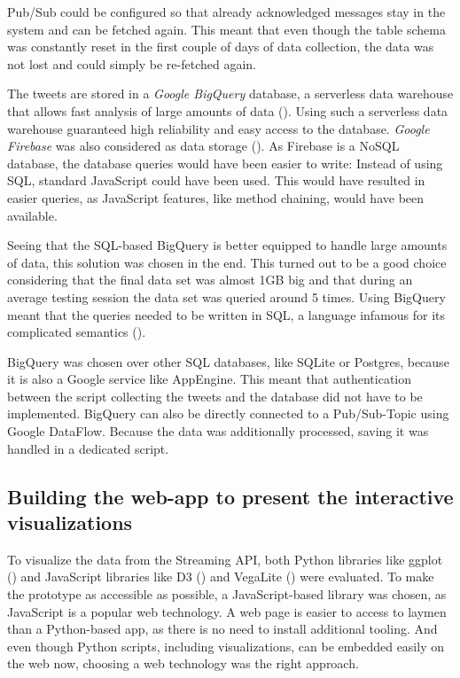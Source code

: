 Pub/Sub could be configured so that already acknowledged messages stay in the system and can be fetched again. This meant that even though the table schema was constantly reset in the first couple of days of data collection, the data was not lost and could simply be re-fetched again.

The tweets are stored in a \emph{Google BigQuery} database, a serverless data warehouse that allows fast analysis of large amounts of data (\cite{googleBigQueryCloudData2020}). Using such a serverless data warehouse guaranteed high reliability and easy access to the database. \emph{Google Firebase} was also considered as data storage (\cite{googleCloudFirestoreFirebase2020}). As Firebase is a NoSQL database, the database queries would have been easier to write: Instead of using SQL, standard JavaScript could have been used. This would have resulted in easier queries, as JavaScript features, like method chaining, would have been available.

Seeing that the SQL-based BigQuery is better equipped to handle large amounts of data, this solution was chosen in the end. This turned out to be a good choice considering that the final data set was almost 1GB big and that during an average testing session the data set was queried around 5 times. Using BigQuery meant that the queries needed to be written in SQL, a language infamous for its complicated semantics (\cite{slutz1998massive}).

BigQuery was chosen over other SQL databases, like SQLite or Postgres, because it is also a Google service like AppEngine. This meant that authentication between the script collecting the tweets and the database did not have to be implemented. BigQuery can also be directly connected to a Pub/Sub-Topic using Google DataFlow. Because the data was additionally processed, saving it was handled in a dedicated script. 

\subsection{Building the web-app to present the interactive visualizations}
To visualize the data from the Streaming API, both Python libraries like ggplot (\cite{wickhamGgplot2ElegantGraphics2016}) and JavaScript libraries like D3 (\cite{bostockD3JsDataDriven}) and VegaLite (\cite{uwidlVegaLiteHighLevelGrammar}) were evaluated. To make the prototype as accessible as possible, a JavaScript-based library was chosen, as JavaScript is a popular web technology. A web page is easier to access to laymen than a Python-based app, as there is no need to install additional tooling. And even though Python scripts, including visualizations, can be embedded easily on the web now, choosing a web technology was the right approach.

